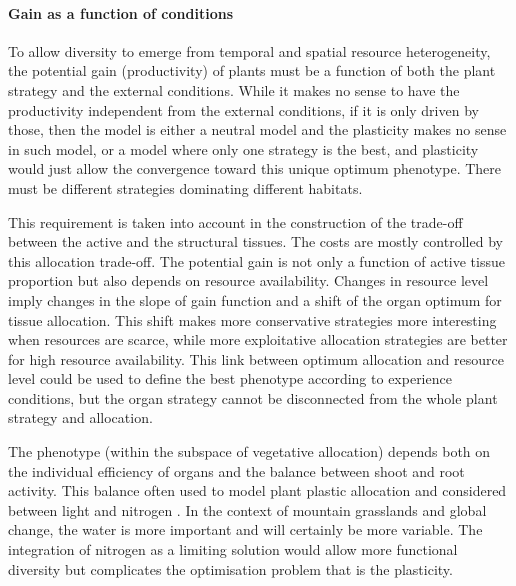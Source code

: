 \paragraph{Gain as a function of conditions}

To allow diversity to emerge from temporal and spatial resource heterogeneity, the potential gain (productivity) of plants must be a function of both the plant strategy and the external conditions. While it makes no sense to have the productivity independent from the external conditions, if it is only driven by those, then the model is either a neutral model and the plasticity makes no sense in such model, or a model where only one strategy is the best, and plasticity would just allow the convergence toward this unique optimum phenotype. There must be different strategies dominating different habitats. 

This requirement is taken into account in the construction of the trade-off between the active and the structural tissues. The costs are mostly controlled by this allocation trade-off. The potential gain is not only a function of active tissue proportion but also depends on resource availability. Changes in resource level imply changes in the slope of gain function and a shift of the organ optimum for tissue allocation. This shift makes more conservative strategies more interesting when resources are scarce, while more exploitative allocation strategies are better for high resource availability. This link between optimum allocation and resource level could be used to define the best phenotype according to experience conditions, but the organ strategy cannot be disconnected from the whole plant strategy and allocation. %

The phenotype (within the subspace of vegetative allocation) depends both on the individual efficiency of organs and the balance between shoot and root activity. This balance often used to model plant plastic allocation and considered between light and nitrogen \parencite{soussana_gemini:_2012, lohier_explaining_2014}. In the context of mountain grasslands and global change, the water is more important and will certainly be more variable. The integration of nitrogen as a limiting solution would allow more functional diversity but complicates the optimisation problem that is the plasticity. 


